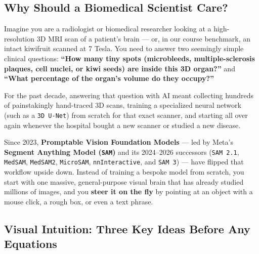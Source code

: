 \documentclass[10.5pt,a4paper]{article}
\begin{document}
\subsection{Why Should a Biomedical Scientist Care?}

Imagine you are a radiologist or biomedical researcher looking at a high-resolution 3D MRI scan of a patient's brain --- or, in our course benchmark, an intact kiwifruit scanned at 7 Tesla. You need to answer two seemingly simple clinical questions: \textbf{``How many tiny spots (microbleeds, multiple-sclerosis plaques, cell nuclei, or kiwi seeds) are inside this 3D organ?''} and \textbf{``What percentage of the organ's volume do they occupy?''}

For the past decade, answering that question with AI meant collecting hundreds of painstakingly hand-traced 3D scans, training a specialized neural network (such as a \texttt{3D U-Net}) from scratch for that exact scanner, and starting all over again whenever the hospital bought a new scanner or studied a new disease.

Since 2023, \textbf{Promptable Vision Foundation Models} --- led by Meta's \textbf{Segment Anything Model (\texttt{SAM})} and its 2024--2026 successors (\texttt{SAM 2.1}, \texttt{MedSAM}, \texttt{MedSAM2}, \texttt{MicroSAM}, \texttt{nnInteractive}, and \texttt{SAM 3}) --- have flipped that workflow upside down. Instead of training a bespoke model from scratch, you start with one massive, general-purpose visual brain that has already studied millions of images, and you \textbf{steer it on the fly} by pointing at an object with a mouse click, a rough box, or even a text phrase.

\subsection{Visual Intuition: Three Key Ideas Before Any Equations}
\end{document}
